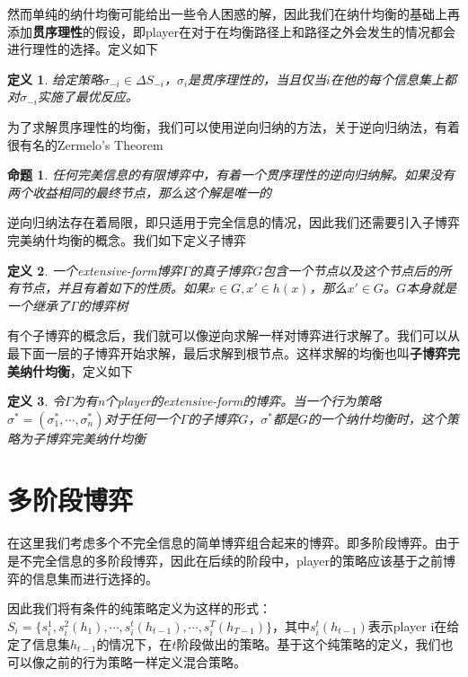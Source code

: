 \documentclass[UTF8,12pt]{ctexart}
\newtheorem{Def}{定义}[section]
\newtheorem{Prop}{命题}[section]
\numberwithin{equation}{section} %
\numberwithin{figure}{section}
\numberwithin{table}{section}
\begin{document}
	然而单纯的纳什均衡可能给出一些令人困惑的解，因此我们在纳什均衡的基础上再添加\textbf{贯序理性}的假设，即player在对于在均衡路径上和路径之外会发生的情况都会进行理性的选择。定义如下
	\begin{Def}
		给定策略$\sigma_{-i} \in \Delta S_{-i}$，$\sigma_i$是贯序理性的，当且仅当$i$在他的每个信息集上都对$\sigma_{-i}$实施了最优反应。
	\end{Def}
	
	为了求解贯序理性的均衡，我们可以使用逆向归纳的方法，关于逆向归纳法，有着很有名的Zermelo's Theorem
	
	\begin{Prop}
		任何完美信息的有限博弈中，有着一个贯序理性的逆向归纳解。如果没有两个收益相同的最终节点，那么这个解是唯一的
	\end{Prop}
	
	逆向归纳法存在着局限，即只适用于完全信息的情况，因此我们还需要引入子博弈完美纳什均衡的概念。我们如下定义子博弈
	\begin{Def}
		一个extensive-form博弈$\Gamma$的真子博弈$G$包含一个节点以及这个节点后的所有节点，并且有着如下的性质。如果$x \in G,x' \in h(x)$，那么$x' \in G$。$G$本身就是一个继承了$\Gamma$的博弈树
	\end{Def}
	
	有个子博弈的概念后，我们就可以像逆向求解一样对博弈进行求解了。我们可以从最下面一层的子博弈开始求解，最后求解到根节点。这样求解的均衡也叫\textbf{子博弈完美纳什均衡}，定义如下
	\begin{Def}
		令$\Gamma$为有n个player的extensive-form的博弈。当一个行为策略$\sigma^* = (\sigma^*_1,\cdots,\sigma^*_n)$对于任何一个$\Gamma$的子博弈$G$，$\sigma^*$都是$G$的一个纳什均衡时，这个策略为子博弈完美纳什均衡
	\end{Def}

	\newpage
	
	\section{多阶段博弈}
	在这里我们考虑多个不完全信息的简单博弈组合起来的博弈。即多阶段博弈。由于是不完全信息的多阶段博弈，因此在后续的阶段中，player的策略应该基于之前博弈的信息集而进行选择的。
	
	因此我们将有条件的纯策略定义为这样的形式：$S_i = \{s^1_i,s^2_i(h_1),\cdots,s^t_i(h_{t-1}),\cdots,s^T_i(h_{T-1})\}$，其中$s^t_i(h_{t-1})$表示player i在给定了信息集$h_{t-1}$的情况下，在$t$阶段做出的策略。基于这个纯策略的定义，我们也可以像之前的行为策略一样定义混合策略。
	
\end{document}
